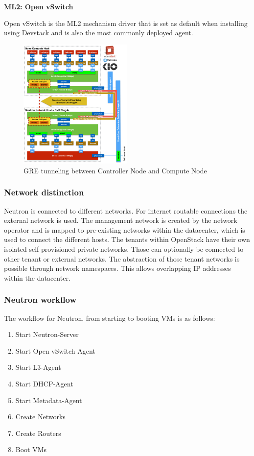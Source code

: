 \textbf{ML2: Open vSwitch}

Open vSwitch is the ML2 mechanism driver that is set as default when installing using Devstack and is also the most commonly deployed agent.

\begin{figure}[H]
\centering
\includegraphics[width=0.5\textwidth]{images/fundamentals/neutron_gre_connection_nodes.jpg}
\caption{GRE tunneling between Controller Node and Compute Node}
\end{figure}

\subsubsection{Network distinction}

Neutron is connected to different networks. For internet routable connections the external network is used. The management network is created by the network operator and is mapped to pre-existing networks within the datacenter, which is used to connect the different hosts. The tenants within OpenStack have their own isolated self provisioned private networks. Those can optionally be connected to other tenant or external networks. The abstraction of those tenant networks is possible through network namespaces. This allows overlapping IP addresses within the datacenter.


\subsubsection{Neutron workflow}

The workflow for Neutron, from starting to booting VMs is as follows:
\begin{enumerate}
\item Start Neutron-Server
\item Start Open vSwitch Agent
\item Start L3-Agent
\item Start DHCP-Agent
\item Start Metadata-Agent
\item Create Networks
\item Create Routers
\item Boot VMs
\end{enumerate}


